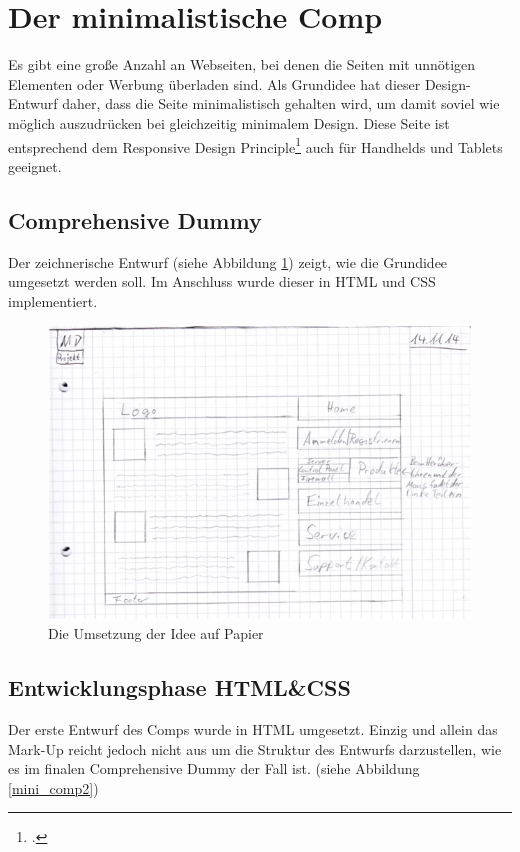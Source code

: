 \section{Der minimalistische Comp}
Es gibt eine große Anzahl an Webseiten, bei denen die Seiten mit unnötigen Elementen oder Werbung überladen sind. Als Grundidee hat dieser Design-Entwurf daher, dass die Seite minimalistisch gehalten wird, um damit soviel wie möglich auszudrücken bei gleichzeitig minimalem Design.  
Diese Seite ist entsprechend dem Responsive Design Principle\footcite[vgl.][]{alistapart:rwd} auch für Handhelds und Tablets geeignet.
	\subsection{Comprehensive Dummy}
Der zeichnerische Entwurf (siehe Abbildung \ref{mini_comp1}) zeigt, wie die Grundidee umgesetzt werden soll. Im Anschluss wurde dieser in HTML und CSS implementiert.

\begin{figure} [hp]
	\includegraphics[width=\textwidth]{./img/mini_comp1.png}
	\caption{Die Umsetzung der Idee auf Papier}
	\label{mini_comp1}
\end{figure}

	\subsection{Entwicklungsphase HTML\&CSS}
Der erste Entwurf des Comps wurde in HTML umgesetzt. Einzig und allein das Mark-Up reicht jedoch nicht aus um die Struktur des Entwurfs darzustellen, wie es im finalen Comprehensive Dummy der Fall ist. (siehe Abbildung \ref{mini_comp2})

